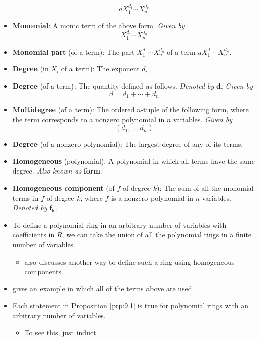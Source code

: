 \documentclass[../notes.tex]{subfiles}
\begin{document}
\begin{itemize}
    \begin{equation*}
        aX_1^{d_1}\cdots X_n^{d_n}
    \end{equation*}
    \item \textbf{Monomial}: A monic term of the above form. \emph{Given by}
    \begin{equation*}
        X_1^{d_1}\cdots X_n^{d_n}
    \end{equation*}
    \item \textbf{Monomial part} (of a term): The part $X_1^{d_1}\cdots X_n^{d_n}$ of a term $aX_1^{d_1}\cdots X_n^{d_n}$.
    \item \textbf{Degree} (in $X_i$ of a term): The exponent $d_i$.
    \item \textbf{Degree} (of a term): The quantity defined as follows. \emph{Denoted by} $\bm{d}$. \emph{Given by}
    \begin{equation*}
        d = d_1+\cdots+d_n
    \end{equation*}
    \item \textbf{Multidegree} (of a term): The ordered $n$-tuple of the following form, where the term corresponds to a nonzero polynomial in $n$ variables. \emph{Given by}
    \begin{equation*}
        (d_1,\dots,d_n)
    \end{equation*}
    \item \textbf{Degree} (of a nonzero polynomial): The largest degree of any of its terms.
    \item \textbf{Homogeneous} (polynomial): A polynomial in which all terms have the same degree. \emph{Also known as} \textbf{form}.
    \item \textbf{Homogeneous component} (of $f$ of degree $k$): The sum of all the monomial terms in $f$ of degree $k$, where $f$ is a nonzero polynomial in $n$ variables. \emph{Denoted by} $\bm{f_k}$.
    \item To define a polynomial ring in an arbitrary number of variables with coefficients in $R$, we can take the union of all the polynomial rings in a finite number of variables.
    \begin{itemize}
        \item \textcite{bib:DummitFoote} also discusses another way to define such a ring using homogeneous components.
    \end{itemize}
    \item \textcite{bib:DummitFoote} gives an example in which all of the terms above are used.
    \item Each statement in Proposition \ref{prp:9.1} is true for polynomial rings with an arbitrary number of variables.
    \begin{itemize}
        \item To see this, just induct.
    \end{itemize}
\end{itemize}
\end{document}
